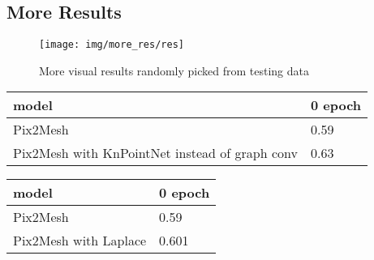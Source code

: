 \begin{appendices}
\section{More Results}
\begin{figure*}[htbp]
	\centering
	\texttt{[image: img/more\_res/res]}
	\caption{More visual results randomly picked from testing data}
	\label{fig:more_res}
\end{figure*}
\begin{table*}
	\label{tab:pix2mesh}
	\centering
	\begin{tabular}{| l | l |}
		model  &   0 epoch   \\
		\hline
		Pix2Mesh &   0.59 \\
		Pix2Mesh with KnPointNet instead of graph conv &   0.63 \\
	\end{tabular}
\end{table*}
\begin{table*}
	\label{tab:concate}
	\centering
	\begin{tabular}{| l | l |}
		model  &   0 epoch   \\
		\hline
		Pix2Mesh &   0.59 \\
		Pix2Mesh with Laplace &   0.601 \\
	\end{tabular}
\end{table*}
\end{appendices}